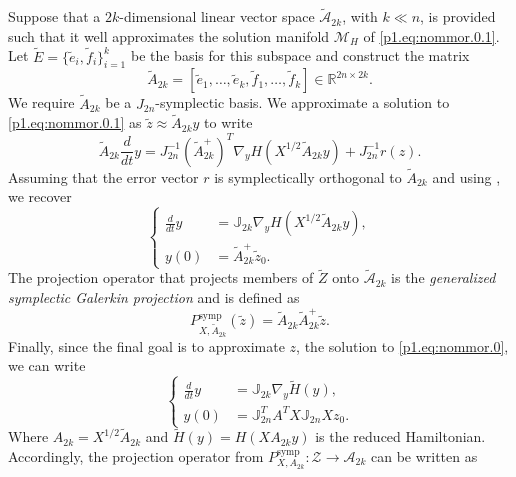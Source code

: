 Suppose that a $2k$-dimensional linear vector space $\tilde{ \mathcal A}_{2k}$, with $k\ll n$, is provided such that it well approximates the solution manifold $\mathcal M_H$ of \eqref{p1.eq:nommor.0.1}. Let $\tilde E = \{ \tilde e_i,\tilde f_i \}_{i=1}^k$ be the basis for this subspace and construct the matrix
\begin{equation} \label{p1.eq:nommor.0.7}
	\tilde A_{2k} = [\tilde e_1,\dots,\tilde e_k,\tilde f_1,\dots,\tilde f_k] \in \mathbb R^{2n\times 2k}.
\end{equation}
We require $\tilde A_{2k}$ be a $J_{2n}$-symplectic basis. We approximate a solution to \eqref{p1.eq:nommor.0.1} as $\tilde z \approx \tilde A_{2k} y$ to write
\begin{equation} \label{p1.eq:nommor.0.8}
	\tilde A_{2k} \frac d {dt} y = J^{-1}_{2n} (\tilde A_{2k}^+)^T \nabla_{y} H(X^{1/2}\tilde A_{2k}y) + J^{-1}_{2n} r(z).
\end{equation}
Assuming that the error vector $r$ is symplectically orthogonal to $\tilde A_{2k}$ and using , we recover
\begin{equation}
	\left\{
	\begin{aligned}
		\frac d {dt} y &= \mathbb J_{2k} \nabla_{y} H(X^{1/2}\tilde A_{2k} y), \\
		y(0) &= \tilde A_{2k}^+ \tilde z_0.
	\end{aligned}
	\right.	
\end{equation}
The projection operator that projects members of $\tilde Z$ onto $\tilde {\mathcal A}_{2k}$ is the \emph{generalized symplectic Galerkin projection} and is defined as
\begin{equation} \label{p1.eq:nommor.0.9}
	P_{X,\tilde A_{2k}}^{\text{symp}}(\tilde z) = \tilde A_{2k} \tilde A_{2k}^+ \tilde z.
\end{equation}
Finally, since the final goal is to approximate $z$, the solution to \eqref{p1.eq:nommor.0}, we can write
\begin{equation} \label{p1.eq:nommor.0.10}
	\left\{
	\begin{aligned}
		\frac{d}{dt} y &= \mathbb J_{2k} \nabla_y \tilde H(y), \\
		y(0) &= \mathbb J_{2n}^T A^T X \mathbb J_{2n} X z_0.
	\end{aligned}
	\right.	
\end{equation}
Where $A_{2k} = X^{1/2} \tilde A_{2k}$ and $\tilde H(y) = H(XA_{2k}y)$ is the reduced Hamiltonian. Accordingly, the projection operator from $P_{X,A_{2k}}^\text{symp}:\mathcal Z\to \mathcal A_{2k}$ can be written as
